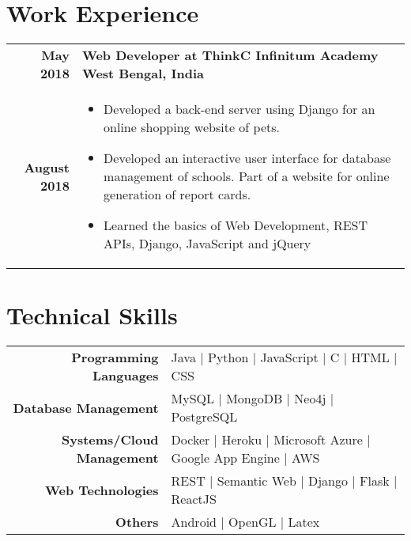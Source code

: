 \documentclass[a4paper,10pt]{article} %
\begin{document}
\section{\textcolor{sectiontitle}{Work Experience}}

\begin{tabular}{r|p{15cm}}
\textbf{May 2018} &  \textbf{Web Developer at ThinkC Infinitum Academy} \hfill \textbf{West Bengal, India}\\
\textbf{August 2018} & 
\begin{itemize}
    \item Developed a back-end server using Django for an online shopping website of pets.
    \item Developed an interactive user interface for database management of schools. Part of a website for online generation of report cards.
    \item Learned the basics of Web Development, REST APIs, Django, JavaScript and jQuery
\end{itemize}

\end{tabular}


\section{\textcolor{sectiontitle}{Technical Skills}}

\begin{tabular}{r|l}

\textbf{Programming Languages} & Java | Python | JavaScript | C | HTML | CSS \\

\textbf{Database Management} & MySQL | MongoDB | Neo4j | PostgreSQL\\

\textbf{Systems/Cloud Management} & Docker | Heroku | Microsoft Azure | Google App Engine | AWS\\

\textbf{Web Technologies} & REST | Semantic Web | Django | Flask | ReactJS \\

\textbf{Others} & Android | OpenGL | Latex\\

\end{tabular}
\end{document}
